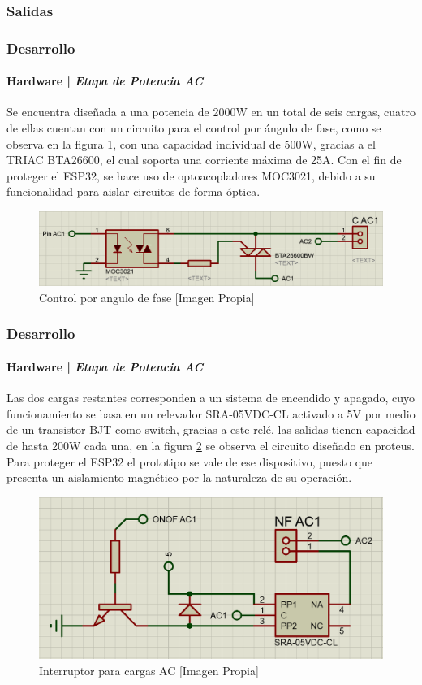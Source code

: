 	\subsubsection{Salidas}
\begin{frame}
	\frametitle{Desarrollo}
	\framesubtitle{Hardware | \emph{Etapa de Potencia AC}}
		Se encuentra diseñada a una potencia de 2000W en un total de seis cargas, cuatro de ellas cuentan con un circuito para el control por ángulo de fase, como se observa en la figura \ref{fig:CAC1}, con una capacidad individual de 500W, gracias a el TRIAC BTA26600, el cual soporta una corriente máxima de 25A. Con el fin de proteger el ESP32, se hace uso de optoacopladores MOC3021, debido a su funcionalidad para aislar circuitos de forma óptica.
		\begin{figure}
			\centering
			\caption{Control por angulo de fase [Imagen Propia]}
			\label{fig:CAC1}
			\includegraphics[width=0.8\linewidth]{Imagenes/CAC1}
		\end{figure}
	
\end{frame}
\begin{frame}
\frametitle{Desarrollo}
\framesubtitle{Hardware | \emph{Etapa de Potencia AC}}
\small	
		Las dos cargas restantes corresponden a un sistema de encendido y apagado, cuyo funcionamiento se basa en un relevador SRA-05VDC-CL activado a 5V por medio de un transistor BJT como switch, gracias a este relé, las salidas tienen capacidad de hasta 200W cada una, en la figura \ref{fig:ONOFAC} se observa el circuito diseñado en proteus. Para proteger el ESP32 el prototipo se vale de ese dispositivo, puesto que presenta un aislamiento magnético por la naturaleza de su operación.
		\begin{figure}
			\centering
			\caption{Interruptor para cargas AC [Imagen Propia]}
			\label{fig:ONOFAC}
			\includegraphics[width=0.45\linewidth]{Imagenes/ONOFAC}
		\end{figure}
\end{frame}

